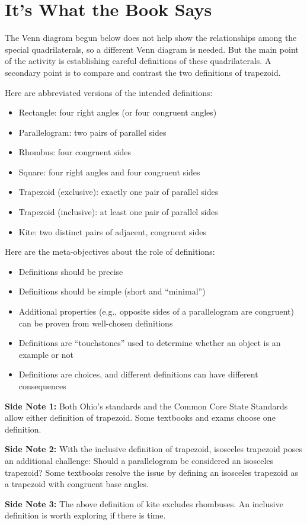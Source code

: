 \newpage
\section{It's What the Book Says} 
\begin{teachingnote}
The Venn diagram begun below does not help show the relationships among the special quadrilaterals, so a different Venn diagram is needed.  But the main point of the activity is establishing careful definitions of these quadrilaterals.  A secondary point is to compare and contrast the two definitions of trapezoid.  

Here are abbreviated versions of the intended definitions: 
\begin{itemize}\itemsep0em
\item Rectangle:  four right angles (or four congruent angles)
\item Parallelogram:  two pairs of parallel sides
\item Rhombus:  four congruent sides
\item Square:  four right angles and four congruent sides
\item Trapezoid (exclusive): exactly one pair of parallel sides
\item Trapezoid (inclusive): at least one pair of parallel sides
\item Kite: two distinct pairs of adjacent, congruent sides
\end{itemize}

Here are the meta-objectives about the role of definitions:  
\begin{itemize}\itemsep0em
\item Definitions should be precise
\item Definitions should be simple (short and ``minimal'')
\item Additional properties (e.g., opposite sides of a parallelogram are congruent) can be proven from well-chosen definitions 
\item Definitions are ``touchstones'' used to determine whether an object is an example or not
\item Definitions are choices, and different definitions can have different consequences
\end{itemize}

\textbf{Side Note 1:} Both Ohio's standards and the Common Core State Standards allow either definition of trapezoid.  Some textbooks and exams choose one definition.  

\textbf{Side Note 2:} With the inclusive definition of trapezoid, isosceles trapezoid poses an additional challenge:  Should a parallelogram be considered an isosceles trapezoid?  Some textbooks resolve the issue by defining an isosceles trapezoid as a trapezoid with congruent base angles.    

\textbf{Side Note 3:} The above definition of kite excludes rhombuses.  An inclusive definition is worth exploring if there is time.  

\end{teachingnote}

